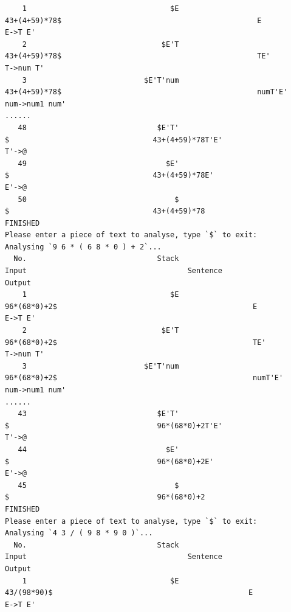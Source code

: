 \documentclass[UTF8]{ctexart}
\begin{document}
\begin{lstlisting}
    1                                 $E                                43+(4+59)*78$                                             E                        E->T E'
    2                               $E'T                                43+(4+59)*78$                                             TE'                        T->num T'
    3                           $E'T'num                                43+(4+59)*78$                                             numT'E'                      num->num1 num'
......
   48                              $E'T'                                            $                                 43+(4+59)*78T'E'                       T'->@
   49                                $E'                                            $                                 43+(4+59)*78E'                       E'->@
   50                                  $                                            $                                 43+(4+59)*78                 FINISHED
Please enter a piece of text to analyse, type `$` to exit:
Analysing `9 6 * ( 6 8 * 0 ) + 2`...
  No.                              Stack                                        Input                                     Sentence                   Output
    1                                 $E                                 96*(68*0)+2$                                             E                        E->T E'
    2                               $E'T                                 96*(68*0)+2$                                             TE'                        T->num T'
    3                           $E'T'num                                 96*(68*0)+2$                                             numT'E'                      num->num1 num'
......
   43                              $E'T'                                            $                                  96*(68*0)+2T'E'                       T'->@
   44                                $E'                                            $                                  96*(68*0)+2E'                       E'->@
   45                                  $                                            $                                  96*(68*0)+2                 FINISHED
Please enter a piece of text to analyse, type `$` to exit:
Analysing `4 3 / ( 9 8 * 9 0 )`...
  No.                              Stack                                        Input                                     Sentence                   Output
    1                                 $E                                  43/(98*90)$                                             E                        E->T E'

\end{lstlisting}
\end{document}
